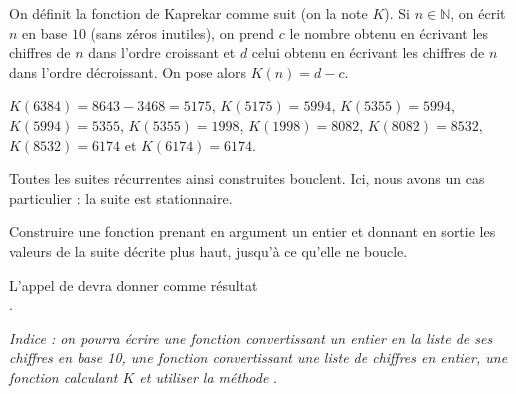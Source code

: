 On définit la fonction de Kaprekar comme suit (on la note $K$). 
Si $n\in\mathbb{N}$, on écrit $n$ en base $10$ (sans zéros inutiles), on prend $c$ le nombre obtenu en écrivant les chiffres de $n$ dans l'ordre croissant et $d$ celui obtenu en écrivant les chiffres de $n$ dans l'ordre décroissant. 
On pose alors $K(n) = d-c$.
\begin{exemple}
  $K(6384) = 8643 - 3468 = 5175$, $K(5175) = 5994$, $K(5355) = 5994$, $K(5994) = 5355$, $K(5355) = 1998$, $K(1998)=8082$, $K(8082) = 8532$, $K(8532) = 6174$ et $K(6174) = 6174$.
\end{exemple}
Toutes les suites récurrentes ainsi construites bouclent. Ici, nous avons un cas particulier : la suite est stationnaire.

\question Construire une fonction  prenant en argument un entier  et donnant en sortie les valeurs de la suite décrite plus haut, jusqu'à ce qu'elle ne boucle. 

\begin{exemple}
  L'appel de  devra donner comme résultat\\ \pyv{[6384, 5175, 5994, 5355, 1998, 8082, 8532, 6174]}.
\end{exemple}

\emph{Indice : on pourra écrire une fonction convertissant un entier en la liste de ses chiffres en base 10, une fonction convertissant une liste de chiffres en entier, une fonction calculant $K$ et utiliser la méthode }.
